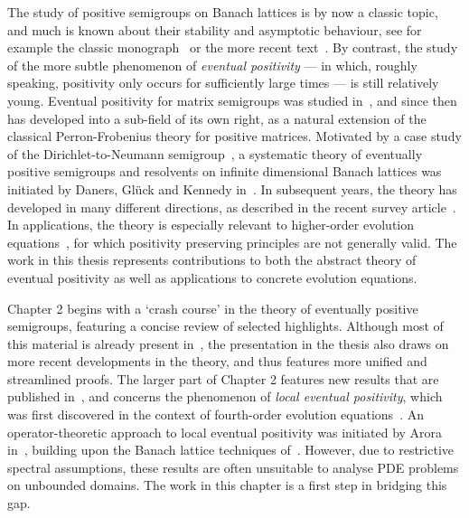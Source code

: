 \documentclass{baustms}
\theoremstyle{cupthm}
\theoremstyle{cupdefn}
\theoremstyle{cuprem}
\numberwithin{equation}{section}
\begin{document}
The study of positive semigroups on Banach lattices is by now a classic topic, and much is known about their stability and asymptotic behaviour, see for example the classic monograph~\cite{AGG} or the more recent text~\cite{BFR}. By contrast, the study of the more subtle phenomenon of \emph{eventual positivity} --- in which, roughly speaking, positivity only occurs for sufficiently large times --- is still relatively young. Eventual positivity for matrix semigroups was studied in~\cite{NT}, and since then has developed into a sub-field of its own right, as a natural extension of the classical Perron-Frobenius theory for positive matrices. Motivated by a case study of the Dirichlet-to-Neumann semigroup~\cite{DD14}, a systematic theory of eventually positive semigroups and resolvents on infinite dimensional Banach lattices was initiated by Daners, Glück and Kennedy in~\cite{DGK1, DGK2}. In subsequent years, the theory has developed in many different directions, as described in the recent survey article~\cite{G22}. In applications, the theory is especially relevant to higher-order evolution equations~\cite{AGRT, DKP, GM}, for which positivity preserving principles are not generally valid. The work in this thesis represents contributions to both the abstract theory of eventual positivity as well as applications to concrete evolution equations.

Chapter 2 begins with a `crash course' in the theory of eventually positive semigroups, featuring a concise review of selected highlights. Although most of this material is already present in~\cite{DGK1,DGK2}, the presentation in the thesis also draws on more recent developments in the theory, and thus features more unified and streamlined proofs. The larger part of Chapter 2 features new results that are published in~\cite{Mui}, and concerns the phenomenon of \emph{local eventual positivity}, which was first discovered in the context of fourth-order evolution equations~\cite{GG-lep, FGG}. An operator-theoretic approach to local eventual positivity was initiated by Arora in~\cite{Ar21}, building upon the Banach lattice techniques of~\cite{DGK1, DGK2}. However, due to restrictive spectral assumptions, these results are often unsuitable to analyse PDE problems on unbounded domains. The work in this chapter is a first step in bridging this gap.
\end{document}
